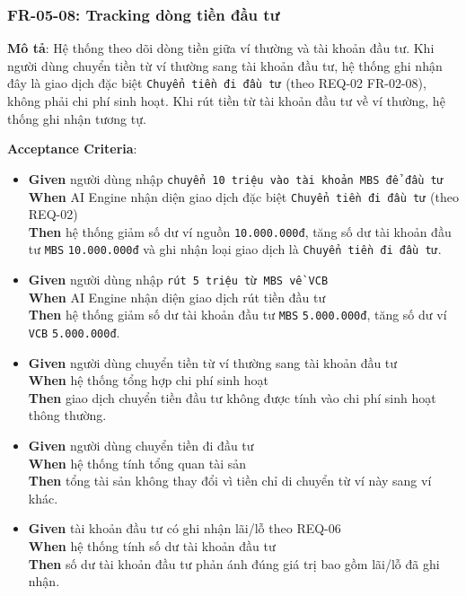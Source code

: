 \subsubsection{FR-05-08: Tracking dòng tiền đầu tư}

\textbf{Mô tả}: Hệ thống theo dõi dòng tiền giữa ví thường và tài khoản đầu tư. Khi người dùng chuyển tiền từ ví thường sang tài khoản đầu tư, hệ thống ghi nhận đây là giao dịch đặc biệt \texttt{Chuyển tiền đi đầu tư} (theo REQ-02 FR-02-08), không phải chi phí sinh hoạt. Khi rút tiền từ tài khoản đầu tư về ví thường, hệ thống ghi nhận tương tự.



\textbf{Acceptance Criteria}:

\begin{itemize}
\item \textbf{Given} người dùng nhập \texttt{chuyển 10 triệu vào tài khoản MBS để đầu tư}  \\ \hspace*{1.5em}  \textbf{When} AI Engine nhận diện giao dịch đặc biệt \texttt{Chuyển tiền đi đầu tư} (theo REQ-02)  \\ \hspace*{1.5em}  \textbf{Then} hệ thống giảm số dư ví nguồn \texttt{10.000.000đ}, tăng số dư tài khoản đầu tư \texttt{MBS} \texttt{10.000.000đ} và ghi nhận loại giao dịch là \texttt{Chuyển tiền đi đầu tư}.
\item \textbf{Given} người dùng nhập \texttt{rút 5 triệu từ MBS về VCB}  \\ \hspace*{1.5em}  \textbf{When} AI Engine nhận diện giao dịch rút tiền đầu tư  \\ \hspace*{1.5em}  \textbf{Then} hệ thống giảm số dư tài khoản đầu tư \texttt{MBS} \texttt{5.000.000đ}, tăng số dư ví \texttt{VCB} \texttt{5.000.000đ}.
\item \textbf{Given} người dùng chuyển tiền từ ví thường sang tài khoản đầu tư  \\ \hspace*{1.5em}  \textbf{When} hệ thống tổng hợp chi phí sinh hoạt  \\ \hspace*{1.5em}  \textbf{Then} giao dịch chuyển tiền đầu tư không được tính vào chi phí sinh hoạt thông thường.
\item \textbf{Given} người dùng chuyển tiền đi đầu tư  \\ \hspace*{1.5em}  \textbf{When} hệ thống tính tổng quan tài sản  \\ \hspace*{1.5em}  \textbf{Then} tổng tài sản không thay đổi vì tiền chỉ di chuyển từ ví này sang ví khác.
\item \textbf{Given} tài khoản đầu tư có ghi nhận lãi/lỗ theo REQ-06  \\ \hspace*{1.5em}  \textbf{When} hệ thống tính số dư tài khoản đầu tư  \\ \hspace*{1.5em}  \textbf{Then} số dư tài khoản đầu tư phản ánh đúng giá trị bao gồm lãi/lỗ đã ghi nhận.
\end{itemize}
